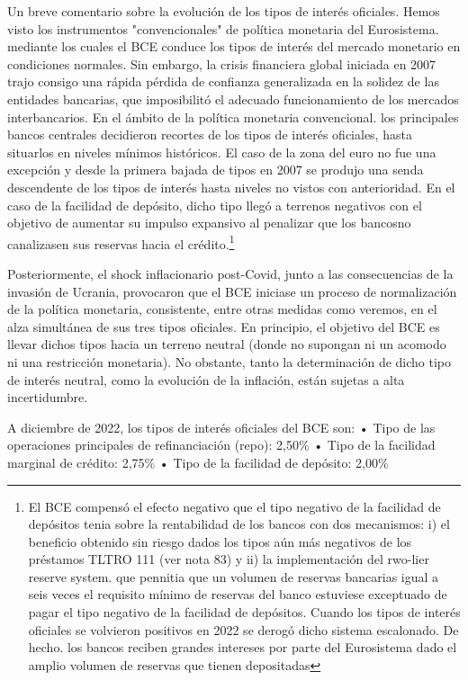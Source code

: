 \documentclass[10pt,a4paper]{article}
\begin{document}
{Un breve comentario sobre la evolución de los tipos de interés oficiales. Hemos visto los instrumentos "convencionales" de política monetaria del Eurosistema. mediante los cuales el BCE conduce los tipos de interés del mercado monetario en condiciones normales. Sin embargo, la crisis financiera global iniciada en 2007 trajo consigo una rápida pérdida de confianza generalizada en la solidez de las entidades bancarias, que imposibilitó el adecuado funcionamiento de los mercados interbancarios. En el ámbito de la política monetaria convencional. los principales bancos centrales decidieron recortes de los tipos de interés oficiales, hasta situarlos en niveles mínimos históricos. El caso de la zona del euro no fue una excepción y desde la primera bajada de tipos en 2007 se produjo una senda descendente de los tipos de interés hasta niveles no vistos con anterioridad. En el caso de la facilidad de depósito, dicho tipo llegó a terrenos negativos con el objetivo de aumentar su impulso expansivo al penalizar que los bancosno canalizasen sus reservas hacia el crédito.\footnote{%
    El BCE compensó el efecto negativo que el tipo negativo de la facilidad de depósitos tenia sobre la rentabilidad de los bancos con dos mecanismos: i) el beneficio obtenido sin riesgo dados los tipos aún más negativos de los préstamos TLTRO 111 (ver nota 83) y ii) la implementación del rwo-lier reserve system. que pennitia que un volumen de reservas bancarias igual a seis veces el requisito mínimo de reservas del banco estuviese exceptuado de pagar el tipo negativo de la facilidad de depósitos. Cuando los tipos de interés oficiales se volvieron positivos en 2022 se derogó dicho sistema escalonado. De hecho. los bancos reciben grandes intereses por parte del Eurosistema dado el amplio volumen de reservas que tienen depositadas
}

Posteriormente, el shock inflacionario post-Covid, junto a las consecuencias de la invasión de Ucrania, provocaron que el BCE iniciase un proceso de normalización de la política monetaria, consistente, entre otras medidas como veremos, en el alza simultánea de sus tres tipos oficiales. En principio, el objetivo del BCE es llevar dichos tipos hacia un terreno neutral (donde no supongan ni un acomodo ni una restricción monetaria). No obstante, tanto la determinación de dicho tipo de interés neutral, como la evolución de la inflación, están sujetas a alta incertidumbre.

A diciembre de 2022, los tipos de interés oficiales del BCE son: • Tipo de las operaciones principales de refinanciación (repo): 2,50\% • Tipo de la facilidad marginal de crédito: 2,75\% • Tipo de la facilidad de depósito: 2,00\% 

}
\end{document}
